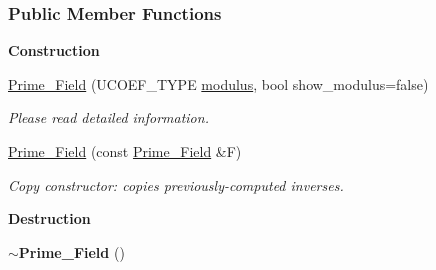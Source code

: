 \subsubsection*{Public Member Functions}
\begin{Indent}\textbf{ Construction}\par
\begin{DoxyCompactItemize}
\item 
\hyperlink{group___fields_group_a2a127ad161be0d732921c7a4bbd19779}{Prime\+\_\+\+Field} (U\+C\+O\+E\+F\+\_\+\+T\+Y\+PE \hyperlink{group___fields_group_a342ee34fa19d33919f772669a637f31e}{modulus}, bool show\+\_\+modulus=false)
\begin{DoxyCompactList}\small\item\em Please read detailed information. \end{DoxyCompactList}\item 
\hyperlink{group___fields_group_a99ac17cca00c87af9ca859c8eae11006}{Prime\+\_\+\+Field} (const \hyperlink{group___fields_group_class_prime___field}{Prime\+\_\+\+Field} \&F)
\begin{DoxyCompactList}\small\item\em Copy constructor\+: copies previously-\/computed inverses. \end{DoxyCompactList}\end{DoxyCompactItemize}
\end{Indent}
\begin{Indent}\textbf{ Destruction}\par
\begin{DoxyCompactItemize}
\item 
\mbox{\label{group___fields_group_a0865fbb0bd4478219f64098ebb1e871d}} 
{\bfseries $\sim$\+Prime\+\_\+\+Field} ()
\end{DoxyCompactItemize}
\end{Indent}

